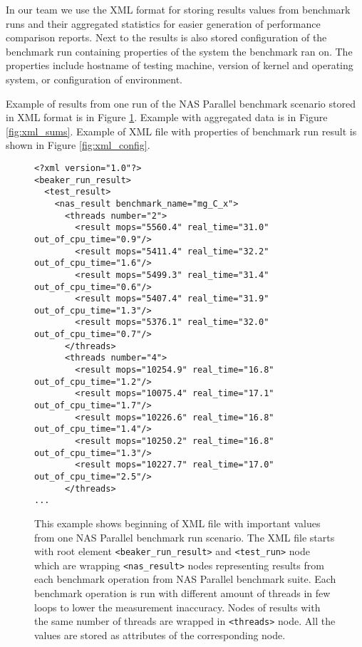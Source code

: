 In our team we use the XML format for storing results values from benchmark runs
and their aggregated statistics for easier generation of performance comparison
reports. Next to the results is also stored configuration of the benchmark run
containing properties of the system the benchmark ran on. The properties include
hostname of testing machine, version of kernel and operating system, or
configuration of environment.

Example of results from one run of the NAS Parallel benchmark scenario stored in
XML format is in Figure \ref{fig:xml_result}. Example with aggregated
data is in Figure \ref{fig:xml_sums}. Example of XML file with properties
of benchmark run result is shown in Figure \ref{fig:xml_config}.

\begin{figure}
  \small
  \begin{verbatim}
<?xml version="1.0"?>
<beaker_run_result>
  <test_result>
    <nas_result benchmark_name="mg_C_x">
      <threads number="2">
        <result mops="5560.4" real_time="31.0" out_of_cpu_time="0.9"/>
        <result mops="5411.4" real_time="32.2" out_of_cpu_time="1.6"/>
        <result mops="5499.3" real_time="31.4" out_of_cpu_time="0.6"/>
        <result mops="5407.4" real_time="31.9" out_of_cpu_time="1.3"/>
        <result mops="5376.1" real_time="32.0" out_of_cpu_time="0.7"/>
      </threads>
      <threads number="4">
        <result mops="10254.9" real_time="16.8" out_of_cpu_time="1.2"/>
        <result mops="10075.4" real_time="17.1" out_of_cpu_time="1.7"/>
        <result mops="10226.6" real_time="16.8" out_of_cpu_time="1.4"/>
        <result mops="10250.2" real_time="16.8" out_of_cpu_time="1.3"/>
        <result mops="10227.7" real_time="17.0" out_of_cpu_time="2.5"/>
      </threads>
...
\end{verbatim}
  \normalsize
  \caption{This example shows beginning of XML file with important values from one NAS
    Parallel benchmark run scenario. The XML file starts with root element
    \texttt{<beaker\_run\_result>} and \texttt{<test\_run>} node which are wrapping
    \texttt{<nas\_result>} nodes representing results from each benchmark operation
    from NAS Parallel benchmark suite. Each benchmark operation is run with
    different amount of threads in few loops to lower the measurement inaccuracy.
    Nodes of results with the same number of threads are wrapped in
    \texttt{<threads>} node. All the values are stored as attributes of the
    corresponding node.}
  \label{fig:xml_result}
\end{figure}

